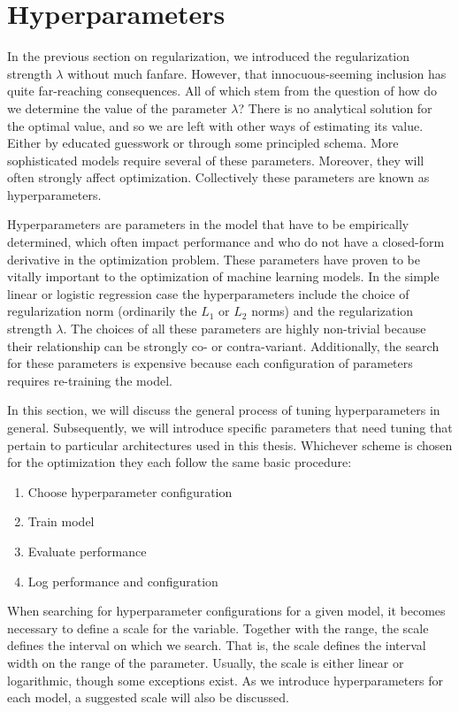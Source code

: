 \section{Hyperparameters}\label{sec:hyperparams}

In the previous section on regularization, we introduced the regularization strength $\lambda$ without much fanfare. However, that innocuous-seeming inclusion has quite far-reaching consequences. All of which stem from the question of how do we determine the value of the parameter $\lambda$? There is no analytical solution for the optimal value, and so we are left with other ways of estimating its value. Either by educated guesswork or through some principled schema. More sophisticated models require several of these parameters. Moreover, they will often strongly affect optimization. Collectively these parameters are known as hyperparameters.

Hyperparameters are parameters in the model that have to be empirically determined, which often impact performance and who do not have a closed-form derivative in the optimization problem. These parameters have proven to be vitally important to the optimization of machine learning models. In the simple linear or logistic regression case the hyperparameters include the choice of regularization norm (ordinarily the $L_1$ or $L_2$ norms) and the regularization strength $\lambda$. The choices of all these parameters are highly non-trivial because their relationship can be strongly co- or contra-variant. Additionally, the search for these parameters is expensive because each configuration of parameters requires re-training the model.

In this section, we will discuss the general process of tuning hyperparameters in general. Subsequently,  we will introduce specific parameters that need tuning that pertain to particular architectures used in this thesis. Whichever scheme is chosen for the optimization they each follow the same basic procedure:

\begin{enumerate}
\item Choose hyperparameter configuration
\item Train model
\item Evaluate performance
\item Log performance and configuration
\end{enumerate}

\noindent When searching for hyperparameter configurations for a given model, it becomes necessary to define a scale for the variable. Together with the range, the scale defines the interval on which we search. That is, the scale defines the interval width on the range of the parameter. Usually, the scale is either linear or logarithmic, though some exceptions exist. As we introduce hyperparameters for each model, a suggested scale will also be discussed.

